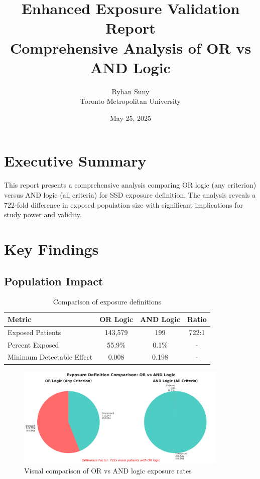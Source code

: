 \documentclass[11pt]{article}
\title{Enhanced Exposure Validation Report\\
\large Comprehensive Analysis of OR vs AND Logic}
\author{Ryhan Suny\\Toronto Metropolitan University}
\date{May 25, 2025}
\begin{document}
\maketitle

\section{Executive Summary}

This report presents a comprehensive analysis comparing OR logic (any criterion) versus AND logic (all criteria) for SSD exposure definition. The analysis reveals a 722-fold difference in exposed population size with significant implications for study power and validity.

\section{Key Findings}

\subsection{Population Impact}

\begin{table}[H]
\centering
\begin{tabular}{lccc}
\toprule
\textbf{Metric} & \textbf{OR Logic} & \textbf{AND Logic} & \textbf{Ratio} \\
\midrule
Exposed Patients & 143,579 & 199 & 722:1 \\
Percent Exposed & 55.9\% & 0.1\% & - \\
Minimum Detectable Effect & 0.008 & 0.198 & - \\
\bottomrule
\end{tabular}
\caption{Comparison of exposure definitions}
\end{table}

\begin{figure}[H]
\centering
\includegraphics[width=0.9\textwidth]{exposure_comparison.png}
\caption{Visual comparison of OR vs AND logic exposure rates}
\end{figure}
\end{document}
